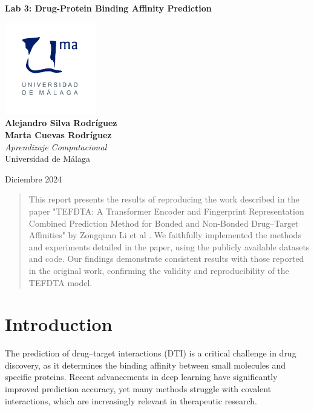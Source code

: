 \documentclass{article}
\begin{document}
\begin{titlepage}
	\centering
	\vspace*{3cm}
	
	{\Huge \textbf{Lab 3: Drug-Protein Binding Affinity Prediction}\\[0.5cm]}
	
	\vspace{2cm}
	\includegraphics[width=0.3\textwidth]{images/uma_logo.jpg}\\[1cm]
	
	{\LARGE \textbf{Alejandro Silva Rodríguez}\\[0.5cm]}
	{\LARGE \textbf{Marta Cuevas Rodríguez}\\[0.5cm]}
	{\large \textit{Aprendizaje Computacional}\\
		Universidad de Málaga\\
		}
	
	\vfill
	
	{\large Diciembre 2024}
\end{titlepage}

\tableofcontents

\newpage

\begin{abstract}
	This report presents the results of reproducing the work described in the paper "TEFDTA: A Transformer Encoder and Fingerprint Representation Combined Prediction Method for Bonded and Non-Bonded Drug–Target Affinities" by Zongquan Li et al \cite{lizongquan2024tefdta}. We faithfully implemented the methods and experiments detailed in the paper, using the publicly available datasets and code. Our findings demonstrate consistent results with those reported in the original work, confirming the validity and reproducibility of the TEFDTA model. 
\end{abstract}

\section{Introduction}
The prediction of drug–target interactions (DTI) is a critical challenge in drug discovery, as it determines the binding affinity between small molecules and specific proteins. Recent advancements in deep learning have significantly improved prediction accuracy, yet many methods struggle with covalent interactions, which are increasingly relevant in therapeutic research.
\\
\end{document}
